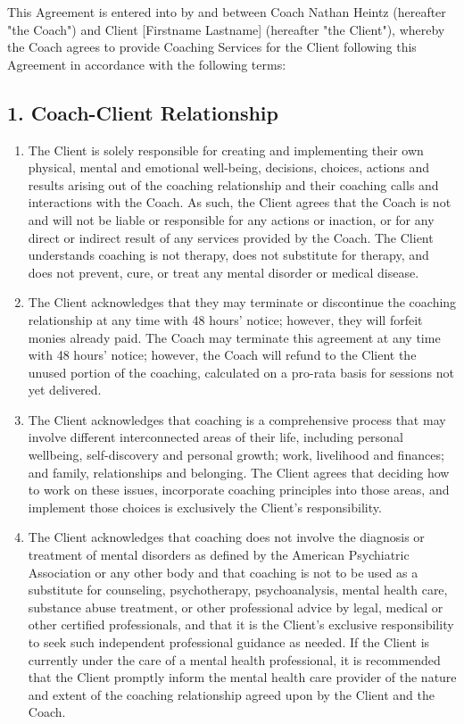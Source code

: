 \documentclass[11pt,letterpaper]{article}
\newcommand{\clientfullname}{[Firstname Lastname]}
\begin{document}
This Agreement is entered into by and between Coach Nathan Heintz (hereafter "the Coach") and Client \clientfullname{} (hereafter "the Client"), whereby the Coach agrees to provide Coaching Services for the Client following this Agreement in accordance with the following terms:

\subsection*{1. Coach-Client Relationship}

\begin{enumerate}[label=\alph*),leftmargin=*,itemsep=6pt]
\item The Client is solely responsible for creating and implementing their own physical, mental and emotional well-being, decisions, choices, actions and results arising out of the coaching relationship and their coaching calls and interactions with the Coach. As such, the Client agrees that the Coach is not and will not be liable or responsible for any actions or inaction, or for any direct or indirect result of any services provided by the Coach. The Client understands coaching is not therapy, does not substitute for therapy, and does not prevent, cure, or treat any mental disorder or medical disease.

\item The Client acknowledges that they may terminate or discontinue the coaching relationship at any time with 48 hours' notice; however, they will forfeit monies already paid. The Coach may terminate this agreement at any time with 48 hours' notice; however, the Coach will refund to the Client the unused portion of the coaching, calculated on a pro-rata basis for sessions not yet delivered.

\item The Client acknowledges that coaching is a comprehensive process that may involve different interconnected areas of their life, including personal wellbeing, self-discovery and personal growth; work, livelihood and finances; and family, relationships and belonging. The Client agrees that deciding how to work on these issues, incorporate coaching principles into those areas, and implement those choices is exclusively the Client's responsibility.

\item The Client acknowledges that coaching does not involve the diagnosis or treatment of mental disorders as defined by the American Psychiatric Association or any other body and that coaching is not to be used as a substitute for counseling, psychotherapy, psychoanalysis, mental health care, substance abuse treatment, or other professional advice by legal, medical or other certified professionals, and that it is the Client's exclusive responsibility to seek such independent professional guidance as needed. If the Client is currently under the care of a mental health professional, it is recommended that the Client promptly inform the mental health care provider of the nature and extent of the coaching relationship agreed upon by the Client and the Coach.


\end{enumerate}
\end{document}

